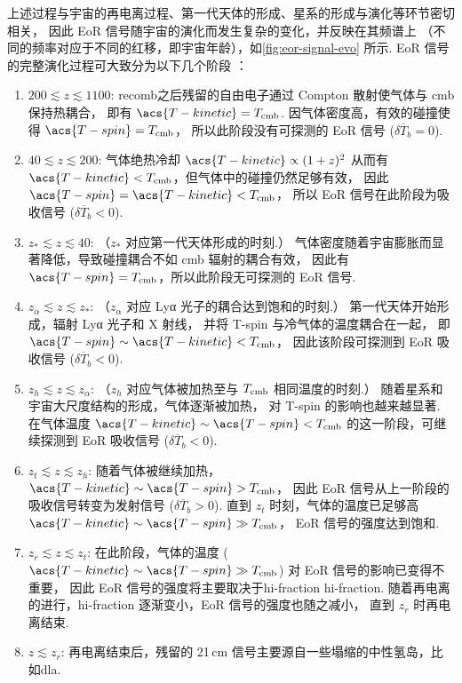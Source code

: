 上述过程与宇宙的再电离过程、第一代天体的形成、星系的形成与演化等环节密切相关，
因此 EoR 信号随宇宙的演化而发生复杂的变化，并反映在其频谱上
（不同的频率对应于不同的红移，即宇宙年龄），如\autoref{fig:eor-signal-evo} 所示.
EoR 信号的完整演化过程可大致分为以下几个阶段 \cite{pritchard2012}：
\begin{enumerate}
  \item $200 \lesssim z \lesssim 1100$:
    \ac{recomb}之后残留的自由电子通过 Compton 散射使气体与 \ac{cmb} 保持热耦合，
    即有 $\acs{T-kinetic} = T_{\R{cmb}}$.
    因气体密度高，有效的碰撞使得 $\acs{T-spin} = T_{\R{cmb}}$，
    所以此阶段没有可探测的 EoR 信号 ($\delta\overline{T}_b = 0$).

  \item $40 \lesssim z \lesssim 200$:
    气体绝热冷却 $\acs{T-kinetic} \propto (1+z)^2$
    从而有 $\acs{T-kinetic} < T_{\R{cmb}}$，但气体中的碰撞仍然足够有效，
    因此 $\acs{T-spin} = \acs{T-kinetic} < T_{\R{cmb}}$，
    所以 EoR 信号在此阶段为吸收信号 ($\delta\overline{T}_b < 0$).

  \item $z_* \lesssim z \lesssim 40$:
    （$z_*$ 对应第一代天体形成的时刻.）
    气体密度随着宇宙膨胀而显著降低，导致碰撞耦合不如 \ac{cmb} 辐射的耦合有效，
    因此有 $\acs{T-spin} = T_{\R{cmb}}$，所以此阶段无可探测的 EoR 信号.

  \item $z_{\alpha} \lesssim z \lesssim z_*$:
    （$z_{\alpha}$ 对应 Lyα 光子的耦合达到饱和的时刻.）
    第一代天体开始形成，辐射 Lyα 光子和 X 射线，
    并将 \acs{T-spin} 与冷气体的温度耦合在一起，
    即 $\acs{T-spin} \sim \acs{T-kinetic} < T_{\R{cmb}}$，
    因此该阶段可探测到 EoR 吸收信号 ($\delta\overline{T}_b < 0$).

  \item $z_h \lesssim z \lesssim z_{\alpha}$:
    （$z_h$ 对应气体被加热至与 $T_{\mathrm{cmb}}$ 相同温度的时刻.）
    随着星系和宇宙大尺度结构的形成，气体逐渐被加热，
    对 \acs{T-spin} 的影响也越来越显著.
    在气体温度 $\acs{T-kinetic} \sim \acs{T-spin} < T_{\R{cmb}}$
    的这一阶段，可继续探测到 EoR 吸收信号 ($\delta\overline{T}_b < 0$).

  \item $z_t \lesssim z \lesssim z_h$:
    随着气体被继续加热，$\acs{T-kinetic} \sim \acs{T-spin} > T_{\R{cmb}}$，
    因此 EoR 信号从上一阶段的吸收信号转变为发射信号 ($\delta\overline{T}_b > 0$).
    直到 $z_t$ 时刻，气体的温度已足够高
    $\acs{T-kinetic} \sim \acs{T-spin} \gg T_{\R{cmb}}$，
    EoR 信号的强度达到饱和.

  \item $z_r \lesssim z \lesssim z_t$:
    在此阶段，气体的温度 ($\acs{T-kinetic} \sim \acs{T-spin} \gg T_{\R{cmb}}$)
    对 EoR 信号的影响已变得不重要，
    因此 EoR 信号的强度将主要取决于\acl{hi-fraction} \acs{hi-fraction}.
    随着再电离的进行，\acs{hi-fraction} 逐渐变小，EoR 信号的强度也随之减小，
    直到 $z_r$ 时再电离结束.

  \item $z \lesssim z_r$:
    再电离结束后，残留的 21\,cm 信号主要源自一些塌缩的中性氢岛，比如\ac{dla}.
\end{enumerate}


